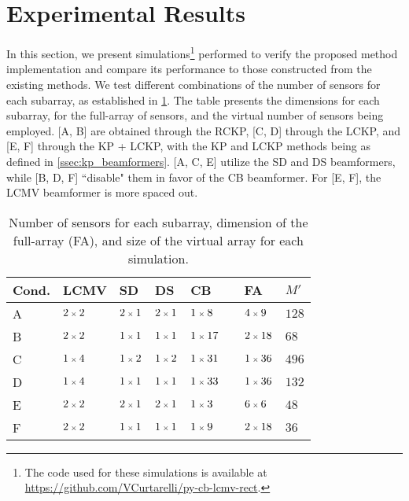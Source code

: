 

\section{Experimental Results}
\label{sec:simulations}

In this section, we present simulations\footnote{The code used for these simulations is available at \url{https://github.com/VCurtarelli/py-cb-lcmv-rect}.} performed to verify the proposed method implementation and compare its performance to those constructed from the existing methods. We test different combinations of the number of sensors for each subarray, as established in \cref{tab:combinations_sizes}. The table presents the dimensions for each subarray, for the full-array of sensors, and the virtual number of sensors being employed. [A, B] are obtained through the RCKP, [C, D] through the LCKP, and [E, F] through the KP + LCKP, with the KP and LCKP methods being as defined in \cref{ssec:kp_beamformers}. [A, C, E] utilize the SD and DS beamformers, while [B, D, F] ``disable" them in favor of the CB beamformer. For [E, F], the LCMV beamformer is more spaced out.

\begin{table}[h]
\centering
\begin{tabular}{llllllll}
	\toprule
	Cond. & LCMV & SD & DS & CB && FA & $M'$\\\midrule
	A & $\sz{2}{2}$ & $\sz{2}{1}$ & $\sz{2}{1}$ & $\sz{1}{8}$ && $\sz{4}{9}$ & $128$ \\
	B & $\sz{2}{2}$ & $\sz{1}{1}$ & $\sz{1}{1}$ & $\sz{1}{17}$ && $\sz{2}{18}$ & $68$  \\
	C & $\sz{1}{4}$ & $\sz{1}{2}$ & $\sz{1}{2}$ & $\sz{1}{31}$ && $\sz{1}{36}$ & $496$ \\
	D & $\sz{1}{4}$ & $\sz{1}{1}$ & $\sz{1}{1}$ & $\sz{1}{33}$ && $\sz{1}{36}$ & $132$ \\
	E & $\sz{2}{2}$ & $\sz{2}{1}$ & $\sz{2}{1}$ & $\sz{1}{3}$  && $\sz{6}{6}$  & $48$  \\
	F & $\sz{2}{2}$ & $\sz{1}{1}$ & $\sz{1}{1}$ & $\sz{1}{9}$ && $\sz{2}{18}$ & $36$  \\
	\bottomrule
\end{tabular}
\caption{Number of sensors for each subarray, dimension of the full-array (FA), and size of the virtual array for each simulation.}
\label{tab:combinations_sizes}
\end{table}




